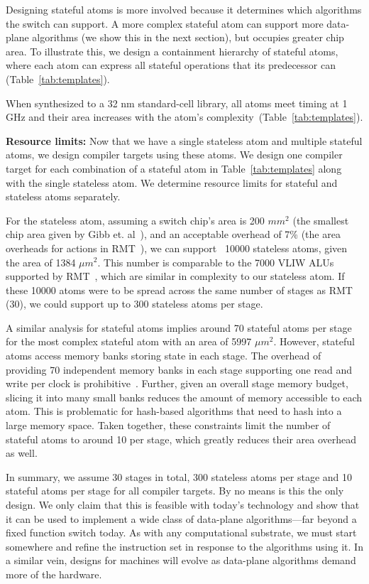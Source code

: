 Designing stateful atoms is more involved because it determines which
algorithms the switch can support. A more complex stateful atom can support
more data-plane algorithms (we show this in the next section), but occupies
greater chip area. To illustrate this, we design a containment hierarchy of
stateful atoms, where each atom can express all stateful operations that its
predecessor can (Table~\ref{tab:templates}).

When synthesized to a 32 nm standard-cell library, all atoms meet timing at 1
GHz and their area increases with the atom's
complexity~(Table~\ref{tab:templates}).

\textbf{Resource limits:}
Now that we have a single stateless atom and multiple stateful atoms, we design
compiler targets using these atoms.  We design one compiler target for each
combination of a stateful atom in Table~\ref{tab:templates} along with the
single stateless atom. We determine resource limits for stateful and stateless
atoms separately.

For the stateless atom, assuming a switch chip's area is 200 $mm^2$ (the
smallest chip area given by Gibb et. al~\cite{gibb_parsing}), and an acceptable
overhead of 7\% (the area overheads for actions in RMT~\cite{rmt}), we can
support ~10000 stateless atoms, given the area of 1384 $\mu m^2$.  This number
is comparable to the 7000 VLIW ALUs supported by RMT~\cite{rmt}, which are
similar in complexity to our stateless atom. If these 10000 atoms were to be
spread across the same number of stages as RMT (30), we could support up to 300
stateless atoms per stage.

A similar analysis for stateful atoms implies around 70 stateful atoms per
stage for the most complex stateful atom with an area of 5997 $\mu m^2$.
However, stateful atoms access memory banks storing state in each stage. The
overhead of providing 70 independent memory banks in each stage supporting one
read and write per clock is prohibitive~\cite{private_conv}. Further, given an
overall stage memory budget, slicing it into many small banks reduces the
amount of memory accessible to each atom. This is problematic for hash-based
algorithms that need to hash into a large memory space. Taken together, these
constraints limit the number of stateful atoms to around 10 per stage, which
greatly reduces their area overhead as well.

In summary, we assume 30 stages in total, 300 stateless atoms per stage and 10
stateful atoms per stage for all compiler targets. By no means is this the only
design. We only claim that this is feasible with today's technology and show
that it can be used to implement a wide class of data-plane algorithms---far
beyond a fixed function switch today. As with any computational substrate, we
must start somewhere and refine the instruction set in response to the
algorithms using it.  In a similar vein, designs for \absmachine machines will
evolve as data-plane algorithms demand more of the hardware.

